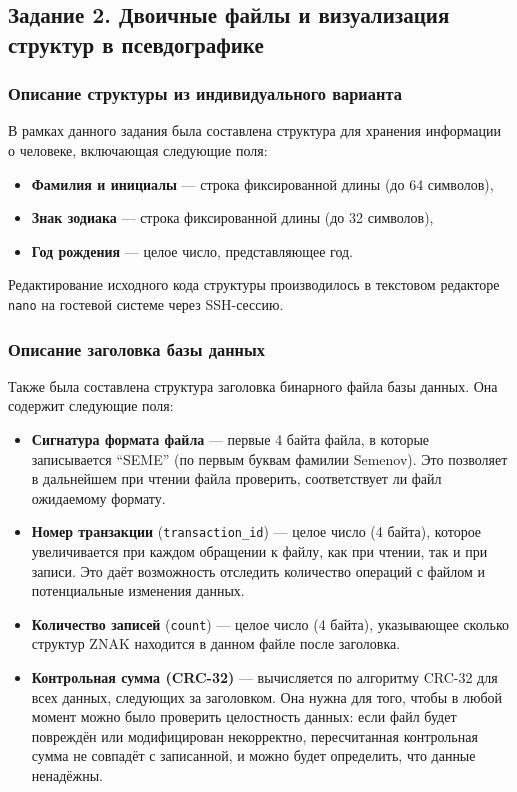 \subsection{Задание 2. Двоичные файлы и визуализация структур в псевдографике}

\subsubsection{Описание структуры из индивидуального варианта}

В рамках данного задания была составлена структура для хранения информации о человеке, включающая следующие поля:
\begin{itemize}
  \item \textbf{Фамилия и инициалы} --- строка фиксированной длины (до 64 символов),
  \item \textbf{Знак зодиака} --- строка фиксированной длины (до 32 символов),
  \item \textbf{Год рождения} --- целое число, представляющее год.
\end{itemize}

Редактирование исходного кода структуры производилось в текстовом редакторе \texttt{nano} на гостевой системе через SSH-сессию. 

\subsubsection{Описание заголовка базы данных}

Также была составлена структура заголовка бинарного файла базы данных. Она содержит следующие поля:
\begin{itemize}
  \item \textbf{Сигнатура формата файла} --- первые 4 байта файла, в которые записывается ``SEME'' (по первым буквам фамилии Semenov). Это позволяет в дальнейшем при чтении файла проверить, соответствует ли файл ожидаемому формату.
  
  \item \textbf{Номер транзакции} (\texttt{transaction\_id}) --- целое число (4 байта), которое увеличивается при каждом обращении к файлу, как при чтении, так и при записи. Это даёт возможность отследить количество операций с файлом и потенциальные изменения данных.
  
  \item \textbf{Количество записей} (\texttt{count}) --- целое число (4 байта), указывающее сколько структур ZNAK находится в данном файле после заголовка.
  
  \item \textbf{Контрольная сумма (CRC-32)} --- вычисляется по алгоритму CRC-32 для всех данных, следующих за заголовком. Она нужна для того, чтобы в любой момент можно было проверить целостность данных: если файл будет повреждён или модифицирован некорректно, пересчитанная контрольная сумма не совпадёт с записанной, и можно будет определить, что данные ненадёжны.
\end{itemize}

